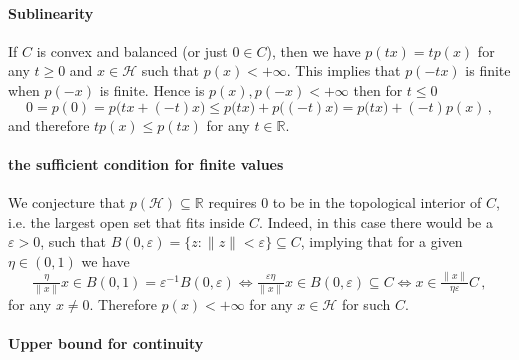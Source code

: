 \documentclass[a4paper]{article}
\newcommand{\Hcal}{\mathcal{H}}
\newcommand{\real}{\mathbb{R}}
\begin{document}

\paragraph{Sublinearity} %
\label{par:sublinearity}

If $C$ is convex and balanced (or just $0 \in C$), then we have $p(t x) = t p(x)$
for any $t\geq 0$ and $x\in \Hcal$ such that $p(x) < +\infty$. This implies that
$p(-t x)$ is finite when $p(-x)$ is finite. Hence is $p(x), p(-x) < +\infty$ then
for $t \leq 0$
\begin{equation*}
  0 = p(0)
    = p\bigl( t x + (- t) x \bigr)
    \leq p\bigl( t x \bigr) + p\bigl( (- t) x \bigr)
    = p\bigl( t x \bigr) + (- t) p( x )
    \,,
\end{equation*}
and therefore $t p(x) \leq p(t x)$ for any $t\in \real$.


\paragraph{the sufficient condition for finite values} %
\label{par:the_sufficient_condition_for_finite_values}

We conjecture that $p(\Hcal) \subseteq \real$ requires $0$ to be in the topological
interior of $C$, i.e. the largest open set that fits inside $C$. Indeed, in this
case there would be a $\varepsilon > 0$, such that $B(0, \varepsilon) = \{z\colon
\|z\| < \varepsilon\} \subseteq C$, implying that for a given $\eta \in (0, 1)$ we
have
\begin{equation*}
  \tfrac{\eta}{\|x\|} x \in B(0, 1) = \varepsilon^{-1} B(0, \varepsilon)
  \Leftrightarrow
  \tfrac{\varepsilon \eta}{\|x\|} x \in B(0, \varepsilon)
  \subseteq C
  \Leftrightarrow
  x \in \tfrac{\|x\|}{\eta \varepsilon} C
  \,,
\end{equation*}
for any $x\neq 0$. Therefore $p(x) < +\infty$ for any $x\in \Hcal$ for such $C$.


\paragraph{Upper bound for continuity} %
\label{par:upper_bound_for_continuity}
\end{document}
